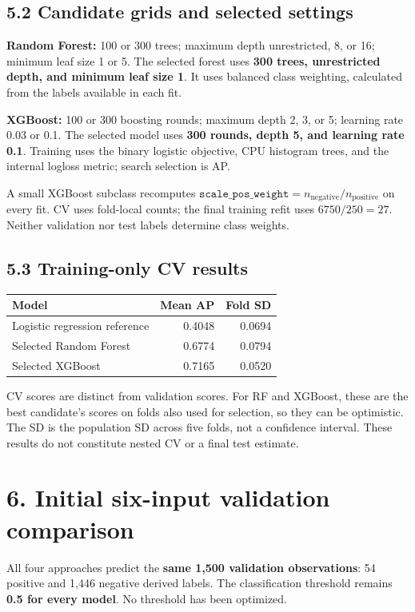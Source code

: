\documentclass[11pt,a4paper]{article}
\newcommand{\pagetitle}[1]{\section*{#1}}
\begin{document}
\subsection*{5.2 Candidate grids and selected settings}
\textbf{Random Forest:} 100 or 300 trees; maximum depth unrestricted, 8, or 16;
minimum leaf size 1 or 5. The selected forest uses \textbf{300 trees,
unrestricted depth, and minimum leaf size 1}. It uses balanced class weighting,
calculated from the labels available in each fit.

\textbf{XGBoost:} 100 or 300 boosting rounds; maximum depth 2, 3, or 5;
learning rate 0.03 or 0.1. The selected model uses \textbf{300 rounds,
depth 5, and learning rate 0.1}. Training uses the binary logistic objective,
CPU histogram trees, and the internal logloss metric; search selection is AP.

A small XGBoost subclass recomputes
\(\texttt{scale\_pos\_weight}=n_{\mathrm{negative}}/n_{\mathrm{positive}}\)
on every fit. CV uses fold-local counts; the final training refit uses
\(6750/250=27\). Neither validation nor test labels determine class weights.

\subsection*{5.3 Training-only CV results}
\begin{center}
\begin{tabular}{lrr}
\toprule
Model & Mean AP & Fold SD \\
\midrule
Logistic regression reference & 0.4048 & 0.0694 \\
Selected Random Forest & 0.6774 & 0.0794 \\
Selected XGBoost & 0.7165 & 0.0520 \\
\bottomrule
\end{tabular}
\end{center}

CV scores are distinct from validation scores. For RF and XGBoost, these are
the best candidate's scores on folds also used for selection, so they can
be optimistic. The SD is the population SD across five folds, not a confidence
interval. These results do not constitute nested CV or a final test estimate.

\newpage
\pagetitle{6. Initial six-input validation comparison}
All four approaches predict the \textbf{same 1,500 validation observations}:
54 positive and 1,446 negative derived labels. The classification threshold
remains \textbf{0.5 for every model}. No threshold has been optimized.
\end{document}
